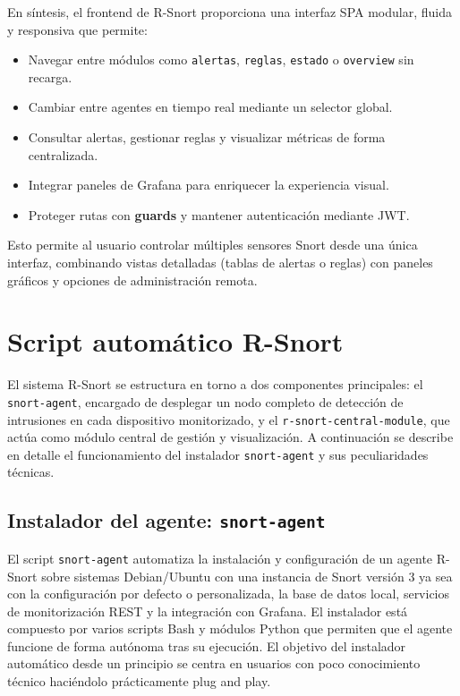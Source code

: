 \documentclass[11pt,a4paper,twoside]{report}
\begin{document}
En síntesis, el frontend de R-Snort proporciona una interfaz SPA modular, fluida y responsiva que permite:

\begin{itemize}
	\item Navegar entre módulos como \texttt{alertas}, \texttt{reglas}, \texttt{estado} o \texttt{overview} sin recarga.
	\item Cambiar entre agentes en tiempo real mediante un selector global.
	\item Consultar alertas, gestionar reglas y visualizar métricas de forma centralizada.
	\item Integrar paneles de Grafana para enriquecer la experiencia visual.
	\item Proteger rutas con \textbf{guards} y mantener autenticación mediante JWT.
\end{itemize}

Esto permite al usuario controlar múltiples sensores Snort desde una única interfaz, combinando vistas detalladas (tablas de alertas o reglas) con paneles gráficos y opciones de administración remota.

\section{Script automático R-Snort}

El sistema R-Snort se estructura en torno a dos componentes principales: el \texttt{snort-agent}, encargado de desplegar un nodo completo de detección de intrusiones en cada dispositivo monitorizado, y el \texttt{r-snort-central-module}, que actúa como módulo central de gestión y visualización. A continuación se describe en detalle el funcionamiento del instalador \texttt{snort-agent} y sus peculiaridades técnicas.

\subsection{Instalador del agente: \texttt{snort-agent}}

El script \texttt{snort-agent} automatiza la instalación y configuración de un agente R-Snort sobre sistemas Debian/Ubuntu con una instancia de Snort versión 3 ya sea con la configuración por defecto o personalizada, la base de datos local, servicios de monitorización REST y la integración con Grafana. El instalador está compuesto por varios scripts Bash y módulos Python que permiten que el agente funcione de forma autónoma tras su ejecución. El objetivo del instalador automático desde un principio se centra en usuarios con poco conocimiento técnico haciéndolo prácticamente plug and play.
\end{document}
